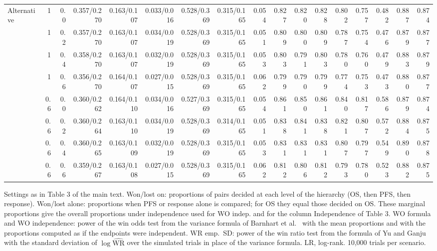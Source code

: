 \begin{table}[htbp]
\begin{threeparttable}
\begin{tabular}{lrrrrrrrrrrrrrrrr}
\midrule
Alternative & 1 & 0.0 & 0.357/0.270 & 0.163/0.107 & 0.033/0.016 & 0.528/0.369 & 0.315/0.165 & 0.054 & 0.827 & 0.820 & 0.828 & 0.802 & 0.757 & 0.482 & 0.887 & 0.874 \\
 & 1 & 0.2 & 0.357/0.270 & 0.163/0.107 & 0.034/0.019 & 0.528/0.369 & 0.315/0.165 & 0.051 & 0.809 & 0.800 & 0.809 & 0.787 & 0.754 & 0.476 & 0.879 & 0.877 \\
 & 1 & 0.4 & 0.358/0.270 & 0.163/0.107 & 0.032/0.019 & 0.528/0.369 & 0.315/0.165 & 0.053 & 0.803 & 0.791 & 0.803 & 0.780 & 0.760 & 0.479 & 0.883 & 0.879 \\
 & 1 & 0.6 & 0.356/0.270 & 0.164/0.107 & 0.027/0.015 & 0.528/0.369 & 0.315/0.165 & 0.062 & 0.799 & 0.790 & 0.799 & 0.774 & 0.753 & 0.473 & 0.880 & 0.877 \\
 & 0.6 & 0.0 & 0.360/0.262 & 0.164/0.110 & 0.034/0.016 & 0.527/0.369 & 0.315/0.165 & 0.054 & 0.861 & 0.850 & 0.861 & 0.840 & 0.817 & 0.586 & 0.879 & 0.874 \\
 & 0.6 & 0.2 & 0.360/0.264 & 0.163/0.110 & 0.034/0.019 & 0.528/0.369 & 0.314/0.165 & 0.051 & 0.838 & 0.841 & 0.838 & 0.821 & 0.807 & 0.572 & 0.884 & 0.875 \\
 & 0.6 & 0.4 & 0.360/0.265 & 0.163/0.109 & 0.032/0.019 & 0.528/0.369 & 0.315/0.165 & 0.053 & 0.831 & 0.831 & 0.831 & 0.807 & 0.797 & 0.549 & 0.890 & 0.878 \\
 & 0.6 & 0.6 & 0.359/0.267 & 0.163/0.108 & 0.027/0.015 & 0.528/0.369 & 0.315/0.165 & 0.062 & 0.812 & 0.806 & 0.812 & 0.793 & 0.780 & 0.523 & 0.882 & 0.875 \\
\bottomrule
\end{tabular}
\begin{tablenotes}
\footnotesize
\item Settings as in Table 3 of the main text. Won/lost on: proportions of pairs decided at each level of the hierarchy (OS, then PFS, then response). Won/lost alone: proportions when PFS or response alone is compared; for OS they equal those decided on OS. These marginal proportions give the overall proportions under independence used for WO indep. and for the column Independence of Table 3. WO formula and WO independence: power of the win odds test from the variance formula of Barnhart et al.~\cite{Barnhart2025} with the mean proportions and with the proportions computed as if the endpoints were independent. WR emp.\ SD: power of the win ratio test from the formula of Yu and Ganju~\cite{Yu2022} with the standard deviation of $\log \widehat{\mathrm{WR}}$ over the simulated trials in place of the variance formula. LR, log-rank. 10,000 trials per scenario.
\end{tablenotes}
\end{threeparttable}
\end{table}
